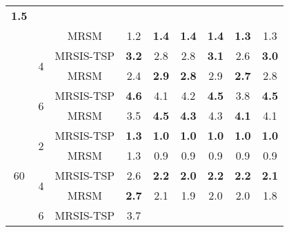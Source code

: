 \begin{table}[]
\begin{tabular}{|c|c|c|cccccc|}
  \textbf{1.5} \\ \cline{3-9}
 &
   &
  MRSM &
  \multicolumn{1}{c|}{1.2} &
  \multicolumn{1}{c|}{\textbf{1.4}} &
  \multicolumn{1}{c|}{\textbf{1.4}} &
  \multicolumn{1}{c|}{\textbf{1.4}} &
  \multicolumn{1}{c|}{\textbf{1.3}} &
  1.3 \\ \cline{2-9}
 &
  \multirow{2}{*}{4} &
  MRSIS-TSP\cite{li2024mrsis} &
  \multicolumn{1}{c|}{\textbf{3.2}} &
  \multicolumn{1}{c|}{2.8} &
  \multicolumn{1}{c|}{2.8} &
  \multicolumn{1}{c|}{\textbf{3.1}} &
  \multicolumn{1}{c|}{2.6} &
  \textbf{3.0} \\ \cline{3-9}
 &
   &
  MRSM &
  \multicolumn{1}{c|}{2.4} &
  \multicolumn{1}{c|}{\textbf{2.9}} &
  \multicolumn{1}{c|}{\textbf{2.8}} &
  \multicolumn{1}{c|}{2.9} &
  \multicolumn{1}{c|}{\textbf{2.7}} &
  2.8 \\ \cline{2-9}
 &
  \multirow{2}{*}{6} &
  MRSIS-TSP\cite{li2024mrsis} &
  \multicolumn{1}{c|}{\textbf{4.6}} &
  \multicolumn{1}{c|}{4.1} &
  \multicolumn{1}{c|}{4.2} &
  \multicolumn{1}{c|}{\textbf{4.5}} &
  \multicolumn{1}{c|}{3.8} &
  \textbf{4.5} \\ \cline{3-9}
 &
   &
  MRSM &
  \multicolumn{1}{c|}{3.5} &
  \multicolumn{1}{c|}{\textbf{4.5}} &
  \multicolumn{1}{c|}{\textbf{4.3}} &
  \multicolumn{1}{c|}{4.3} &
  \multicolumn{1}{c|}{\textbf{4.1}} &
  4.1 \\ \hline\hline
\multirow{6}{*}{60} &
  \multirow{2}{*}{2} &
  MRSIS-TSP\cite{li2024mrsis} &
  \multicolumn{1}{c|}{\textbf{1.3}} &
  \multicolumn{1}{c|}{\textbf{1.0}} &
  \multicolumn{1}{c|}{\textbf{1.0}} &
  \multicolumn{1}{c|}{\textbf{1.0}} &
  \multicolumn{1}{c|}{\textbf{1.0}} &
  \textbf{1.0} \\ \cline{3-9}
 &
   &
  MRSM &
  \multicolumn{1}{c|}{1.3} &
  \multicolumn{1}{c|}{0.9} &
  \multicolumn{1}{c|}{0.9} &
  \multicolumn{1}{c|}{0.9} &
  \multicolumn{1}{c|}{0.9} &
  0.9 \\ \cline{2-9}
 &
  \multirow{2}{*}{4} &
  MRSIS-TSP\cite{li2024mrsis} &
  \multicolumn{1}{c|}{2.6} &
  \multicolumn{1}{c|}{\textbf{2.2}} &
  \multicolumn{1}{c|}{\textbf{2.0}} &
  \multicolumn{1}{c|}{\textbf{2.2}} &
  \multicolumn{1}{c|}{\textbf{2.2}} &
  \textbf{2.1} \\ \cline{3-9}
 &
   &
  MRSM &
  \multicolumn{1}{c|}{\textbf{2.7}} &
  \multicolumn{1}{c|}{2.1} &
  \multicolumn{1}{c|}{1.9} &
  \multicolumn{1}{c|}{2.0} &
  \multicolumn{1}{c|}{2.0} &
  1.8 \\ \cline{2-9}
 &
  \multirow{2}{*}{6} &
  MRSIS-TSP\cite{li2024mrsis} &
  \multicolumn{1}{c|}{3.7} &

\end{tabular}
\end{table}
